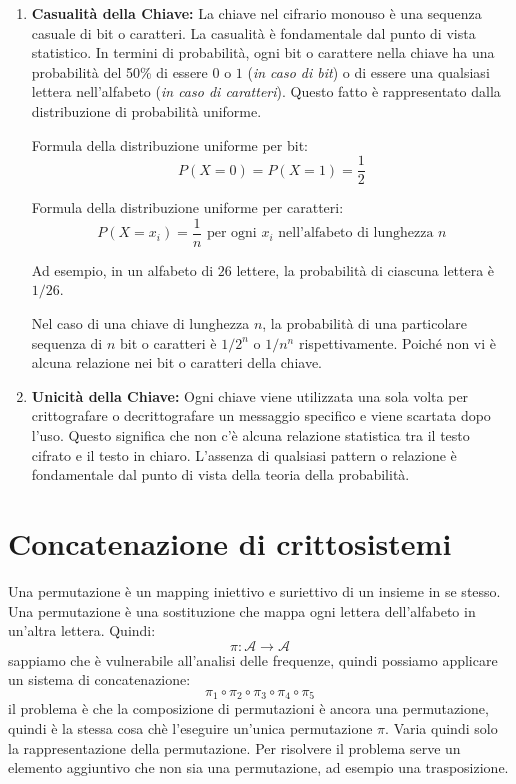 \begin{enumerate}
    \item \textbf{Casualità della Chiave:} La chiave nel cifrario monouso è una sequenza casuale di bit o caratteri.
    La casualità è fondamentale dal punto di vista statistico. In termini di probabilità, ogni bit o carattere nella
    chiave ha una probabilità del 50\% di essere $0$ o $1$ (\textit{in caso di bit}) o di essere una qualsiasi
    lettera nell'alfabeto (\textit{in caso di caratteri}). Questo fatto è rappresentato dalla distribuzione di
    probabilità uniforme.
   
    Formula della distribuzione uniforme per bit:
    \[ P(X = 0) = P(X = 1) = \frac{1}{2} \]

    Formula della distribuzione uniforme per caratteri:
    \[ P(X = x_i) = \frac{1}{n} \text{ per ogni } x_i \text{ nell'alfabeto di lunghezza } n \]

    Ad esempio, in un alfabeto di $26$ lettere, la probabilità di ciascuna lettera è $1/26$.

    Nel caso di una chiave di lunghezza $n$, la probabilità di una particolare sequenza di $n$ bit o caratteri
    è $1/2^n$ o $1/n^n$ rispettivamente. Poiché non vi è alcuna relazione nei bit o caratteri della chiave.

    \item \textbf{Unicità della Chiave:} Ogni chiave viene utilizzata una sola volta per crittografare
    o decrittografare un messaggio specifico e viene scartata dopo l'uso. Questo significa che non c'è alcuna
    relazione statistica tra il testo cifrato e il testo in chiaro. L'assenza di qualsiasi pattern o relazione
    è fondamentale dal punto di vista della teoria della probabilità.
\end{enumerate}
\section{Concatenazione di crittosistemi}
Una permutazione è un mapping iniettivo e suriettivo di un insieme in se stesso.
Una permutazione è una sostituzione che mappa ogni lettera dell'alfabeto in un'altra lettera.
Quindi:
\[
    \pi : \mathcal{A} \rightarrow \mathcal{A}
\]
sappiamo che è vulnerabile all'analisi delle frequenze, quindi possiamo applicare 
un sistema di concatenazione:
\[
  \pi_1 \circ \pi_2 \circ \pi_3 \circ \pi_4 \circ \pi_5  
\]
il problema è che la composizione di permutazioni è ancora una permutazione,
quindi è la stessa cosa chè l'eseguire un'unica permutazione $\pi$.
Varia quindi solo la rappresentazione della permutazione.
Per risolvere il problema serve un elemento aggiuntivo che non sia una permutazione,
ad esempio una trasposizione.
